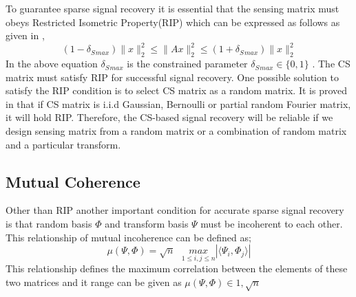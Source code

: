 To guarantee sparse signal recovery it is essential that the  sensing matrix must obeys  Restricted Isometric Property(RIP) which can be expressed as follows as given in \cite{candes,Candes08},
\begin{equation}
    (1-\delta_S{_{max}}) \|x\|_2^2 \le \| A x \|_2^2 \le (1+\delta_S{_{max}})\|x\|_2^2
\end{equation}
In the above equation $\delta_S{_{max}} $ is the constrained parameter  $\delta_S{_{max}} \in \{0,1\}$ . The CS matrix must satisfy RIP for successful signal recovery.
One possible solution to satisfy the RIP condition is to select CS matrix as a random matrix. It is proved in \cite{sensing_mat} that if CS matrix is i.i.d Gaussian, Bernoulli or partial random Fourier matrix, it will hold RIP.
Therefore, the CS-based signal recovery will be reliable if we design sensing matrix from a random matrix or a combination of random matrix and a particular transform\cite{sparse_channel, Candes08}.
 
 \subsection{Mutual Coherence}
 Other than RIP another important condition for accurate sparse signal recovery is that random basis $\Phi$ and transform basis $\Psi$ must be incoherent to each other. This relationship of mutual incoherence can be defined as;
 \begin{equation}
     \mu(\Psi, \Phi)= \sqrt{n}\textrm{ } \underset{{1\le i,j \le n} }{max}|\langle \Psi_i, \Phi_j \rangle|
 \end{equation}
 This relationship defines the maximum correlation between the elements of these two matrices and it range can be given as $ \mu(\Psi, \Phi) \in {1,\sqrt{n}}$ \cite{Candes08}
